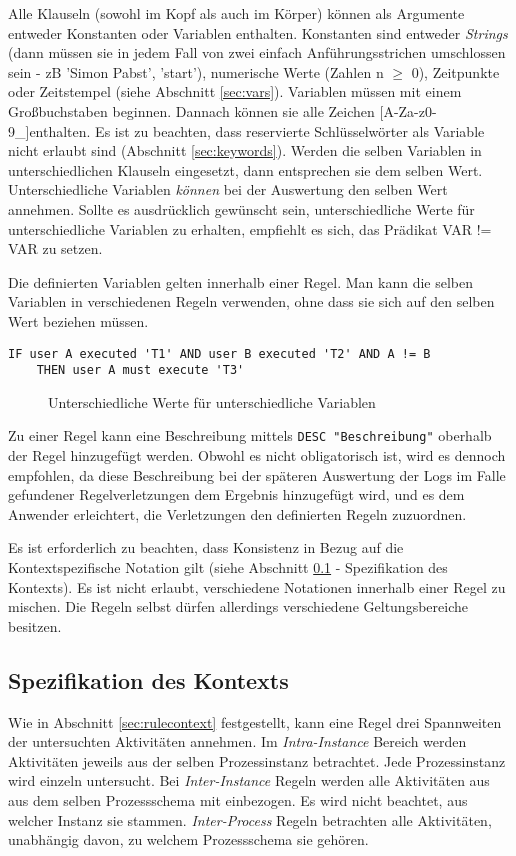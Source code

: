 Alle Klauseln (sowohl im Kopf als auch im Körper) können als Argumente entweder Konstanten oder Variablen enthalten. Konstanten sind entweder \textit{Strings} (dann müssen sie in jedem Fall von zwei einfach Anführungsstrichen umschlossen sein - zB 'Simon Pabst', 'start'), numerische Werte (Zahlen n $\geq$ 0), Zeitpunkte oder Zeitstempel (siehe Abschnitt \ref{sec:vars}). Variablen müssen mit einem Großbuchstaben beginnen. Dannach können sie alle Zeichen [A-Za-z0-9\_]enthalten. Es ist zu beachten, dass reservierte Schlüsselwörter als Variable nicht erlaubt sind (Abschnitt \ref{sec:keywords}). Werden die selben Variablen in unterschiedlichen Klauseln eingesetzt, dann entsprechen sie dem selben Wert. Unterschiedliche Variablen \textit{können} bei der Auswertung den selben Wert annehmen. Sollte es ausdrücklich gewünscht sein, unterschiedliche Werte für unterschiedliche Variablen zu erhalten, empfiehlt es sich, das Prädikat VAR != VAR zu setzen.

Die definierten Variablen gelten innerhalb einer Regel. Man kann die selben Variablen in verschiedenen Regeln verwenden, ohne dass sie sich auf den selben Wert beziehen müssen.

\begin{verbatim}
IF user A executed 'T1' AND user B executed 'T2' AND A != B
    THEN user A must execute 'T3'
\end{verbatim}
\begin{figure}[!h]
\caption{Unterschiedliche Werte für unterschiedliche Variablen}
\label{fig:diffvars}
\end{figure}

Zu einer Regel kann eine Beschreibung mittels \texttt{DESC "Beschreibung"} oberhalb der Regel hinzugefügt werden. Obwohl es nicht obligatorisch ist, wird es dennoch empfohlen, da diese Beschreibung bei der späteren Auswertung der Logs im Falle gefundener Regelverletzungen dem Ergebnis hinzugefügt wird, und es dem Anwender erleichtert, die Verletzungen den definierten Regeln zuzuordnen.

Es ist erforderlich zu beachten, dass Konsistenz in Bezug auf die Kontextspezifische Notation gilt (siehe Abschnitt \ref{sec:context} - Spezifikation des Kontexts). Es ist nicht erlaubt, verschiedene Notationen innerhalb einer Regel zu mischen. Die Regeln selbst dürfen allerdings verschiedene Geltungsbereiche besitzen.

\subsection{Spezifikation des Kontexts}
\label{sec:context}
Wie in Abschnitt \ref{sec:rulecontext} festgestellt, kann eine Regel drei Spannweiten der untersuchten Aktivitäten annehmen. Im \textit{Intra-Instance} Bereich werden Aktivitäten jeweils aus der selben Prozessinstanz betrachtet. Jede Prozessinstanz wird einzeln untersucht. Bei \textit{Inter-Instance} Regeln werden alle Aktivitäten aus aus dem selben Prozessschema mit einbezogen. Es wird nicht beachtet, aus welcher Instanz sie stammen. \textit{Inter-Process} Regeln betrachten alle Aktivitäten, unabhängig davon, zu welchem Prozessschema sie gehören.


